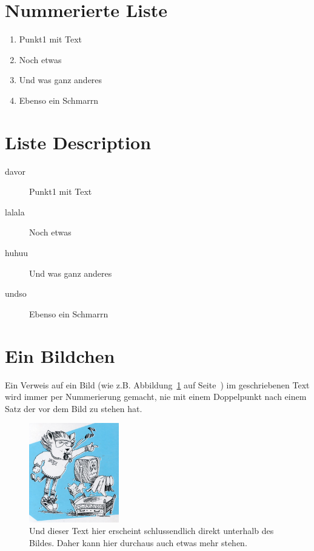 \section{Nummerierte Liste}
\begin{enumerate}
\item Punkt1 mit Text
\item Noch etwas
\item Und was ganz anderes
\item Ebenso ein Schmarrn
\end{enumerate}


\section{Liste Description}
\begin{description}
\item[davor] Punkt1 mit Text
\item[lalala] Noch etwas
\item[huhuu] Und was ganz anderes
\item[undso] Ebenso ein Schmarrn
\end{description}


\section{Ein Bildchen}
Ein Verweis auf ein Bild (wie z.B. Abbildung~\ref{fig:texlogo} auf Seite~\pageref{fig:texlogo}) im geschriebenen Text wird immer per Nummerierung gemacht, nie mit einem Doppelpunkt nach einem Satz der vor dem Bild zu stehen hat.

\begin{figure}[h]
        \centering
            \includegraphics[width=0.35\textwidth]{img/latex.jpg}    %
            \caption[\LaTeX~Logo]
                {Und dieser Text hier erscheint schlussendlich direkt unterhalb des Bildes. Daher kann hier durchaus auch etwas mehr stehen\citefigureown.}
            \label{fig:texlogo}
\end{figure}

